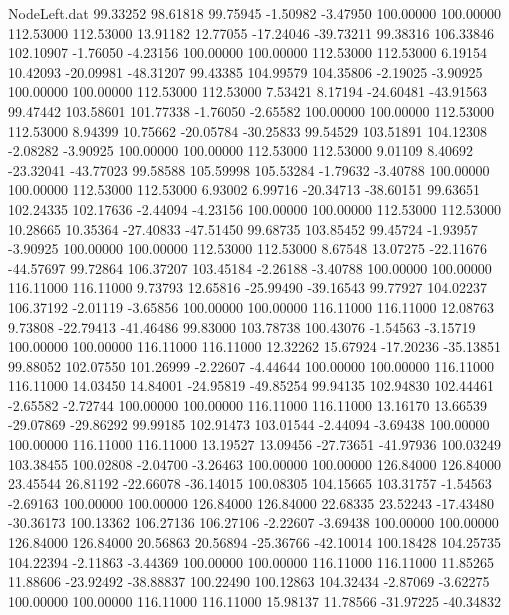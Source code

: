 \begin{filecontents}{NodeLeft.dat}
  99.33252   98.61818   99.75945    -1.50982   -3.47950  100.00000  100.00000  112.53000  112.53000   13.91182   12.77055  -17.24046  -39.73211
  99.38316  106.33846  102.10907    -1.76050   -4.23156  100.00000  100.00000  112.53000  112.53000    6.19154   10.42093  -20.09981  -48.31207
  99.43385  104.99579  104.35806    -2.19025   -3.90925  100.00000  100.00000  112.53000  112.53000    7.53421    8.17194  -24.60481  -43.91563
  99.47442  103.58601  101.77338    -1.76050   -2.65582  100.00000  100.00000  112.53000  112.53000    8.94399   10.75662  -20.05784  -30.25833
  99.54529  103.51891  104.12308    -2.08282   -3.90925  100.00000  100.00000  112.53000  112.53000    9.01109    8.40692  -23.32041  -43.77023
  99.58588  105.59998  105.53284    -1.79632   -3.40788  100.00000  100.00000  112.53000  112.53000    6.93002    6.99716  -20.34713  -38.60151
  99.63651  102.24335  102.17636    -2.44094   -4.23156  100.00000  100.00000  112.53000  112.53000   10.28665   10.35364  -27.40833  -47.51450
  99.68735  103.85452   99.45724    -1.93957   -3.90925  100.00000  100.00000  112.53000  112.53000    8.67548   13.07275  -22.11676  -44.57697
  99.72864  106.37207  103.45184    -2.26188   -3.40788  100.00000  100.00000  116.11000  116.11000    9.73793   12.65816  -25.99490  -39.16543
  99.77927  104.02237  106.37192    -2.01119   -3.65856  100.00000  100.00000  116.11000  116.11000   12.08763    9.73808  -22.79413  -41.46486
  99.83000  103.78738  100.43076    -1.54563   -3.15719  100.00000  100.00000  116.11000  116.11000   12.32262   15.67924  -17.20236  -35.13851
  99.88052  102.07550  101.26999    -2.22607   -4.44644  100.00000  100.00000  116.11000  116.11000   14.03450   14.84001  -24.95819  -49.85254
  99.94135  102.94830  102.44461    -2.65582   -2.72744  100.00000  100.00000  116.11000  116.11000   13.16170   13.66539  -29.07869  -29.86292
  99.99185  102.91473  103.01544    -2.44094   -3.69438  100.00000  100.00000  116.11000  116.11000   13.19527   13.09456  -27.73651  -41.97936
 100.03249  103.38455  100.02808    -2.04700   -3.26463  100.00000  100.00000  126.84000  126.84000   23.45544   26.81192  -22.66078  -36.14015
 100.08305  104.15665  103.31757    -1.54563   -2.69163  100.00000  100.00000  126.84000  126.84000   22.68335   23.52243  -17.43480  -30.36173
 100.13362  106.27136  106.27106    -2.22607   -3.69438  100.00000  100.00000  126.84000  126.84000   20.56863   20.56894  -25.36766  -42.10014
 100.18428  104.25735  104.22394    -2.11863   -3.44369  100.00000  100.00000  116.11000  116.11000   11.85265   11.88606  -23.92492  -38.88837
 100.22490  100.12863  104.32434    -2.87069   -3.62275  100.00000  100.00000  116.11000  116.11000   15.98137   11.78566  -31.97225  -40.34832

\end{filecontents}
